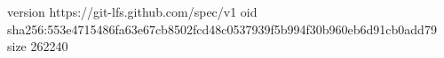 version https://git-lfs.github.com/spec/v1
oid sha256:553e4715486fa63e67cb8502fcd48c0537939f5b994f30b960eb6d91cb0add79
size 262240
